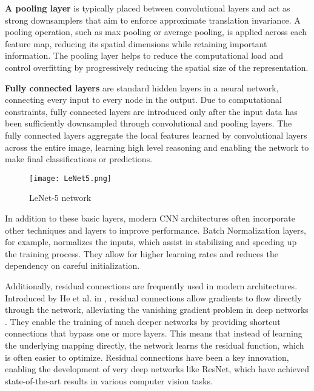 \documentclass[../../thesis.tex]{subfiles}
\begin{document}
\textbf{A pooling layer} is typically placed between convolutional layers and  act as strong downsamplers that aim to enforce approximate translation invariance. A pooling operation, such as max pooling or average pooling, is applied across each feature map, reducing its spatial dimensions while retaining important information. The pooling layer helps to reduce the computational load and control overfitting by progressively reducing the spatial size of the representation.\newline

\textbf{Fully connected layers} are standard hidden layers in a neural network, connecting every input to every node in the output. Due to computational constraints, fully connected layers are introduced only after the input data has been sufficiently downsampled through convolutional and pooling layers. The fully connected layers aggregate the local features learned by convolutional layers across the entire image, learning high level reasoning and enabling the network to make final classifications or predictions.

\begin{figure}[h]
    \centering
    \texttt{[image: LeNet5.png]}
    \caption{LeNet-5 network \cite{LeCun1989ConvNet}}
    \label{fig:LeNet5}
\end{figure}

In addition to these basic layers, modern CNN architectures often incorporate other techniques and layers to improve performance. Batch Normalization layers, for example, normalizes the inputs, which assist in stabilizing and speeding up the training process. They allow for higher learning rates and reduces the dependency on careful initialization.\newline

Additionally, residual connections are frequently used in modern architectures. Introduced by He et al. in \cite{he2015deep}, residual connections allow gradients to flow directly through the network, alleviating the vanishing gradient problem in deep networks \cite{279181}. They enable the training of much deeper networks by providing shortcut connections that bypass one or more layers. This means that instead of learning the underlying mapping directly, the network learns the residual function, which is often easier to optimize. Residual connections have been a key innovation, enabling the development of very deep networks like ResNet, which have achieved state-of-the-art results in various computer vision tasks.
\end{document}
